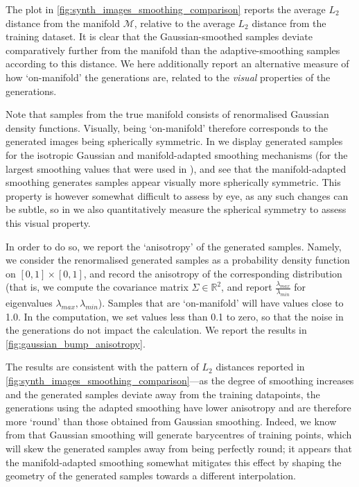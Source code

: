 \documentclass[10pt]{article}
\theoremstyle{plain}
\theoremstyle{definition}
\theoremstyle{remark}
\begin{document}
The plot in \cref{fig:synth_images_smoothing_comparison} reports the average $L_2$ distance from the manifold $\mathcal{M}$, relative to the average $L_2$ distance from the training dataset. It is clear that the Gaussian-smoothed samples deviate comparatively further from the manifold than the adaptive-smoothing samples according to this distance. We here additionally report an alternative measure of how `on-manifold' the generations are, related to the \textit{visual} properties of the generations.

Note that samples from the true manifold consists of renormalised Gaussian density functions.
Visually, being `on-manifold' therefore corresponds to the generated images being spherically symmetric. 
In  we display generated samples for the isotropic Gaussian and manifold-adapted smoothing mechanisms (for the largest smoothing values that were used in ), and see that the manifold-adapted smoothing generates samples appear visually more spherically symmetric. This property is however somewhat difficult to assess by eye, as any such changes can be subtle, so in  we also quantitatively measure the spherical symmetry to assess this visual property.

In order to do so, we report the `anisotropy' of the generated samples. Namely, we consider the renormalised generated samples as a probability density function on $[0,1] \times [0,1]$, and record the anisotropy of the corresponding distribution (that is, we compute the covariance matrix $\Sigma \in \mathbb{R}^2$, and report $\frac{\lambda_{max}}{\lambda_{min}}$ for eigenvalues $\lambda_{max}, \lambda_{min}$). Samples that are `on-manifold' will have values close to 1.0. In the computation, we set values less than 0.1 to zero, so that the noise in the generations do not impact the calculation.
We report the results in \cref{fig:gaussian_bump_anisotropy}.

The results are consistent with the pattern of $L_2$ distances reported in \cref{fig:synth_images_smoothing_comparison}—as the degree of smoothing increases and the generated samples deviate away from the training datapoints, the generations using the adapted smoothing have lower anisotropy and are therefore more `round' than those obtained from Gaussian smoothing. Indeed, we know from \citet{scarvelis2023closedformdiffusionmodels} that Gaussian smoothing will generate barycentres of training points, which will skew the generated samples away from being perfectly round; it appears that the manifold-adapted smoothing somewhat mitigates this effect by shaping the geometry of the generated samples towards a different interpolation.
\end{document}
